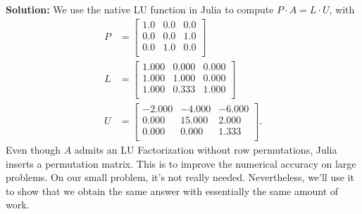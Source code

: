 \textbf{Solution:} We use the native LU function in Julia to compute $P \cdot A = L \cdot U$, with
\begin{equation}
    \label{eq:Chap5pt4LUwithPerm}
    \begin{aligned}
        P&= \left[
\begin{array}{ccc}
1.0 & 0.0 & 0.0 \\
0.0 & 0.0 & 1.0 \\
0.0 & 1.0 & 0.0 \\
\end{array}
\right]\\
L&= \left[ \begin{array}{ccc}
1.000 & 0.000 & 0.000 \\
1.000 & 1.000 & 0.000 \\
1.000 & 0.333 & 1.000 \\
\end{array}
\right]\\
U&= 
\left[
\begin{array}{rrr}
-2.000 & -4.000 & -6.000 \\
0.000 & 15.000 & 2.000 \\
0.000 & 0.000 & 1.333 \\
\end{array}
\right].
 \end{aligned}
\end{equation}
Even though $A$ admits an LU Factorization without row permutations, Julia inserts a permutation matrix. This is to improve the numerical accuracy on large problems. On our small problem, it's not really needed. Nevertheless, we'll use it to show that we obtain the same answer with essentially the same amount of work.\\

